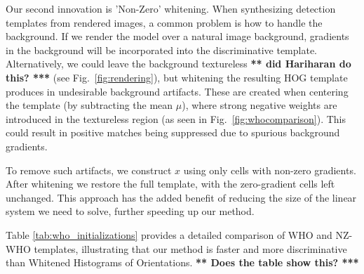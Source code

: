 \documentclass[10pt,twocolumn,letterpaper]{article}
\newcommand{\scream}[1]{{\color{red} \bf *** #1 ***}}
\begin{document}
Our second innovation is 'Non-Zero' whitening. When synthesizing detection templates from rendered images, a common problem is how to handle the background. If we render the model over a natural image background, gradients in the background will be incorporated into the discriminative template. Alternatively, we could leave the background textureless \scream{did Hariharan do this?} (see Fig.~\ref{fig:rendering}), but whitening the resulting HOG template produces in undesirable background artifacts. These are created when centering the template (by subtracting the mean $\mu$), where strong negative weights are introduced in the textureless region (as seen in Fig.~\ref{fig:whocomparison}). This could result in positive matches being suppressed due to spurious background gradients.

To remove such artifacts, we construct $x$ using only cells with non-zero gradients. After whitening we restore the full template, with the zero-gradient cells left unchanged. This approach has the added benefit of reducing the size of the linear system we need to solve, further speeding up our method.

Table \ref{tab:who_initializations} provides a detailed comparison of WHO and NZ-WHO templates, illustrating that our method is faster and more discriminative than Whitened Histograms of Orientations. \scream{Does the table show this?}





\end{document}
